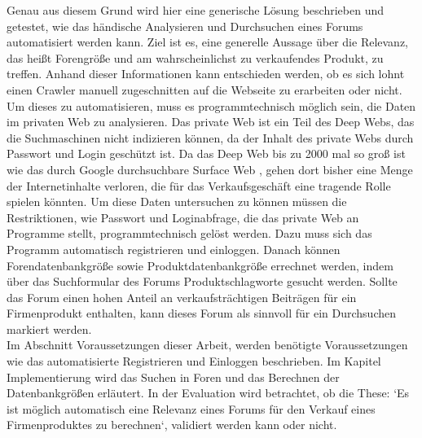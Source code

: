 Genau aus diesem Grund wird hier eine generische Lösung beschrieben und getestet, wie das händische Analysieren und Durchsuchen eines Forums automatisiert werden kann. Ziel ist es, eine generelle Aussage über die Relevanz, das heißt Forengröße und am wahrscheinlichst zu verkaufendes Produkt, zu treffen. Anhand dieser Informationen kann entschieden werden, ob es sich lohnt einen Crawler manuell zugeschnitten auf die Webseite zu erarbeiten oder nicht.
Um dieses zu automatisieren, muss es programmtechnisch möglich sein, die Daten im privaten Web zu analysieren. Das private Web ist ein Teil des Deep Webs, das die Suchmaschinen nicht indizieren können, da der Inhalt des private Webs durch Passwort und Login geschützt ist. Da das Deep Web bis zu 2000 mal so groß ist wie das durch Google durchsuchbare Surface Web \cite{gupta2014comparative}, gehen dort bisher eine Menge der Internetinhalte verloren, die für das Verkaufsgeschäft eine tragende Rolle spielen könnten. Um diese Daten untersuchen zu können müssen die Restriktionen, wie Passwort und Loginabfrage, die das private Web an Programme stellt, programmtechnisch gelöst werden. Dazu muss sich das Programm automatisch registrieren und einloggen. Danach können Forendatenbankgröße sowie Produktdatenbankgröße errechnet werden, indem über das Suchformular des Forums Produktschlagworte gesucht werden. Sollte das Forum einen hohen Anteil an verkaufsträchtigen Beiträgen für ein Firmenprodukt enthalten, kann dieses Forum als sinnvoll für ein Durchsuchen markiert werden.\\
Im Abschnitt Voraussetzungen dieser Arbeit, werden benötigte Voraussetzungen wie das automatisierte Registrieren und Einloggen beschrieben. Im Kapitel Implementierung wird das Suchen in Foren und das Berechnen der Datenbankgrößen erläutert. In der Evaluation wird betrachtet, ob die These: `Es ist möglich automatisch eine Relevanz eines Forums für den Verkauf eines Firmenproduktes zu berechnen`, validiert werden kann oder nicht.
\newpage
